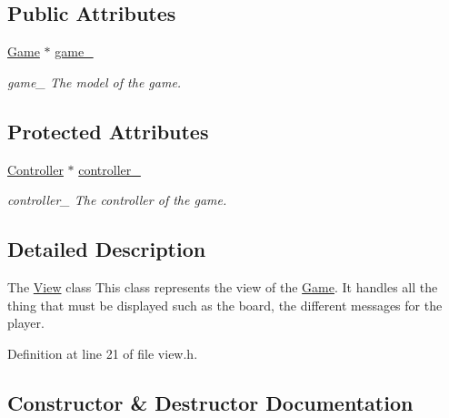 \subsection*{Public Attributes}
\begin{DoxyCompactItemize}
\item 
\mbox{\label{class_view_aa7cd2209f94372357b26b489575044fa}} 
\hyperlink{class_game}{Game} $\ast$ \hyperlink{class_view_aa7cd2209f94372357b26b489575044fa}{game\+\_\+}
\begin{DoxyCompactList}\small\item\em game\+\_\+ The model of the game. \end{DoxyCompactList}\end{DoxyCompactItemize}
\subsection*{Protected Attributes}
\begin{DoxyCompactItemize}
\item 
\mbox{\label{class_view_a61e30639a8c0f510c0f6d15700d72e30}} 
\hyperlink{class_controller}{Controller} $\ast$ \hyperlink{class_view_a61e30639a8c0f510c0f6d15700d72e30}{controller\+\_\+}
\begin{DoxyCompactList}\small\item\em controller\+\_\+ The controller of the game. \end{DoxyCompactList}\end{DoxyCompactItemize}


\subsection{Detailed Description}
The \hyperlink{class_view}{View} class This class represents the view of the \hyperlink{class_game}{Game}. It handles all the thing that must be displayed such as the board, the different messages for the player. 

Definition at line 21 of file view.\+h.



\subsection{Constructor \& Destructor Documentation}
\mbox{\label{class_view_a7c91b725a55a7843fc628e29d85f53a2}} 
